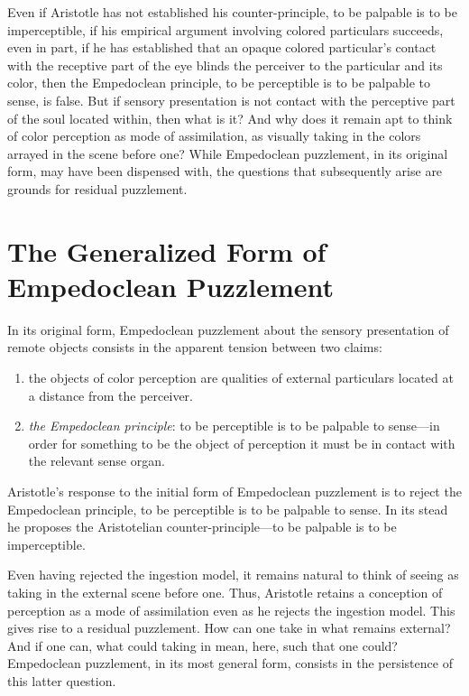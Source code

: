Even if Aristotle has not established his counter-principle, to be palpable is to be imperceptible, if his empirical argument involving colored particulars succeeds, even in part, if he has established that an opaque colored particular's contact with the receptive part of the eye blinds the perceiver to the particular and its color, then the Empedoclean principle, to be perceptible is to be palpable to sense, is false. But if sensory presentation is not contact with the perceptive part of the soul located within, then what is it? And why does it remain apt to think of color perception as mode of assimilation, as visually taking in the colors arrayed in the scene before one? While Empedoclean puzzlement, in its original form, may have been dispensed with, the questions that subsequently arise are grounds for residual puzzlement.


\section{The Generalized Form of Empedoclean Puzzlement} %
\label{sec:the_generalized_form_of_empedoclean_puzzlement}

In its original form, Empedoclean puzzlement about the sensory presentation of remote objects consists in the apparent tension between two claims:
\begin{enumerate}[(1)]
    \item the objects of color perception are qualities of external particulars located at a distance from the perceiver.
    \item \emph{the Empedoclean principle}: to be perceptible is to be palpable to sense---in order for something to be the object of perception it must be in contact with the relevant sense organ.
\end{enumerate}
Aristotle's response to the initial form of Empedoclean puzzlement is to reject the Empedoclean principle, to be perceptible is to be palpable to sense. In its stead he proposes the Aristotelian counter-principle---to be palpable is to be imperceptible. 

Even having rejected the ingestion model, it remains natural to think of seeing as taking in the external scene before one. Thus, Aristotle retains a conception of perception as a mode of assimilation even as he rejects the ingestion model. This gives rise to a residual puzzlement. How can one take in what remains external? And if one can, what could taking in mean, here, such that one could? Empedoclean puzzlement, in its most general form, consists in the persistence of this latter question.

